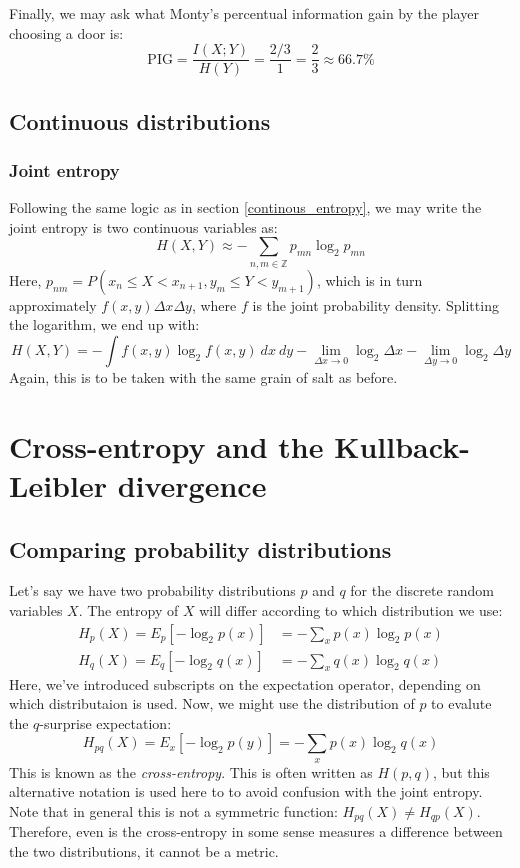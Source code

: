 \documentclass[12pt, a4paper]{article}
\numberwithin{equation}{section}
\begin{document}
Finally, we may ask what Monty's percentual information gain by the player choosing a door is:
\begin{equation}
\textrm{PIG}=\frac{I(X;Y)}{H(Y)}=\frac{2/3}{1}=\frac{2}{3}\approx 66.7\%
\end{equation}

\subsection{Continuous distributions}

\subsubsection{Joint entropy}
Following the same logic as in section \ref{continous_entropy}, we may write the joint entropy is two continuous variables as:
\begin{equation}
H(X,Y)\approx-\sum_{n,m\in\mathbb{Z}}p_{mn}\log_2 p_{mn}
\end{equation}
Here, $p_{nm}=P(x_n\le X<x_{n+1}, y_m\le Y<y_{m+1})$, which is in turn approximately $f(x,y)\Delta x\Delta y$, where $f$ is the joint probability density. Splitting the logarithm, we end up with:
\begin{equation}
H(X,Y)=-\int f(x,y)\log_2 f(x,y)\ dx\ dy-\lim_{\Delta x\rightarrow 0}\log_2\Delta x-\lim_{\Delta y\rightarrow 0}\log_2\Delta y
\end{equation}
Again, this is to be taken with the same grain of salt as before.


\section{Cross-entropy and the Kullback-Leibler divergence}

\subsection{Comparing probability distributions}
Let's say we have two probability distributions $p$ and $q$ for the discrete random variables $X$. The entropy of $X$ will differ according to which distribution we use:
\begin{align}
\label{p_entropy}
H_p(X)=E_p[-\log_2 p(x)]&=-\sum_x p(x)\log_2 p(x)\\
H_q(X)=E_q[-\log_2 q(x)]&=-\sum_x q(x)\log_2 q(x)
\end{align}
Here, we've introduced subscripts on the expectation operator, depending on which distributaion is used. Now, we might use the distribution of $p$ to evalute the $q$-surprise expectation: 
\begin{equation}
\label{crossentropy}
H_{pq}(X)=E_x[-\log_2 p(y)]=-\sum_x p(x)\log_2 q(x)
\end{equation}
This is known as the \textit{cross-entropy}. This is often written as $H(p,q)$, but this alternative notation is used here to to avoid confusion with the joint entropy. Note that in general this is not a symmetric function: $H_{pq}(X)\neq H_{qp}(X)$. Therefore, even is the cross-entropy in some sense measures a difference between the two distributions, it cannot be a metric.
\end{document}
